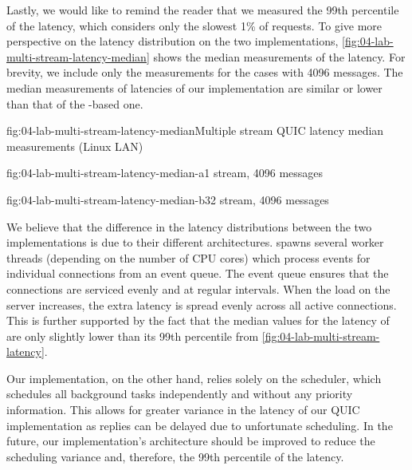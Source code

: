 Lastly, we would like to remind the reader that we measured the 99th percentile of the latency,
which considers only the slowest 1\% of requests. To give more perspective on the latency
distribution on the two implementations, \autoref{fig:04-lab-multi-stream-latency-median} shows the
median measurements of the latency. For brevity, we include only the measurements for the cases with
\SI{4096}{\byte} messages. The median measurements of latencies of our implementation are similar or
lower than that of the \libmsquic{}-based one.

\begin{myFigure}{fig:04-lab-multi-stream-latency-median}{Multiple stream QUIC latency median measurements (Linux LAN)}
\begin{mySubfigure}{0.49\linewidth}{fig:04-lab-multi-stream-latency-median-a}{1 stream, \SI{4096}{\byte} messages}
\footnotesize

\end{mySubfigure}
\begin{mySubfigure}{0.49\linewidth}{fig:04-lab-multi-stream-latency-median-b}{32 stream, \SI{4096}{\byte} messages}
\footnotesize

\end{mySubfigure}
\end{myFigure}

We believe that the difference in the latency distributions between the two implementations is due
to their different architectures. \libmsquic{} spawns several worker threads (depending on the
number of CPU cores) which process events for individual connections from an event queue. The event
queue ensures that the connections are serviced evenly and at regular intervals. When the load on
the server increases, the extra latency is spread evenly across all active connections. This is
further supported by the fact that the median values for the latency of \libmsquic{} are only
slightly lower than its 99th percentile from \autoref{fig:04-lab-multi-stream-latency}.

Our implementation, on the other hand, relies solely on the \dotnet{}  scheduler, which
schedules all background tasks independently and without any priority information. This allows for
greater variance in the latency of our QUIC implementation as replies can be delayed due to
unfortunate scheduling. In the future, our implementation's architecture should be improved to
reduce the scheduling variance and, therefore, the 99th percentile of the latency.

